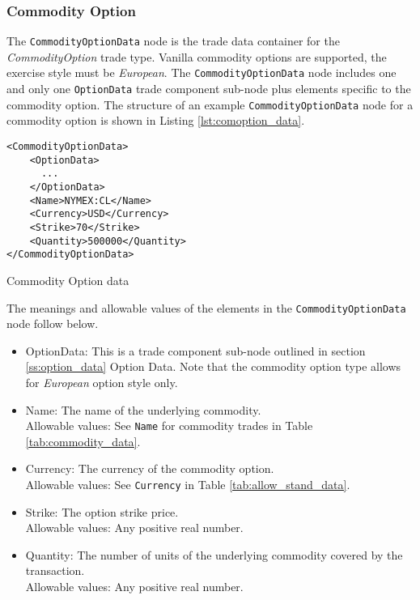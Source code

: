 \subsubsection{Commodity Option}

The \lstinline!CommodityOptionData!  node is the trade data container for the \emph{CommodityOption} trade type.  Vanilla commodity 
options are supported, the exercise style must be \emph{European}. The \lstinline!CommodityOptionData!  node includes one and 
only one \lstinline!OptionData! trade component sub-node plus elements specific to the commodity option. The structure of 
an example \lstinline!CommodityOptionData! node for a commodity option is shown in Listing
\ref{lst:comoption_data}.

\begin{listing}[H]
\begin{verbatim}
<CommodityOptionData>
    <OptionData>
      ...
    </OptionData>
    <Name>NYMEX:CL</Name>
    <Currency>USD</Currency>
    <Strike>70</Strike>
    <Quantity>500000</Quantity>
</CommodityOptionData>
\end{verbatim}
\caption{Commodity Option data}
\label{lst:comoption_data}
\end{listing}

The meanings and allowable values of the elements in the \lstinline!CommodityOptionData!  node follow below.

\begin{itemize}
	\item OptionData: This is a trade component sub-node outlined in section \ref{ss:option_data} Option Data. Note 
	that the commodity option type allows for \emph{European} option style only.	
	\item Name: The name of the underlying commodity. \\
	Allowable values:  See \lstinline!Name! for commodity trades in Table \ref{tab:commodity_data}. \\
	\item Currency: The currency of the commodity option. \\
	Allowable values:  See \lstinline!Currency! in Table \ref{tab:allow_stand_data}.	
	\item Strike: The option strike price.\\
	Allowable values:  Any positive real number.	
	\item Quantity: The number of units of the underlying commodity covered by the transaction. \\
	Allowable values:  Any positive real number.
\end{itemize}
